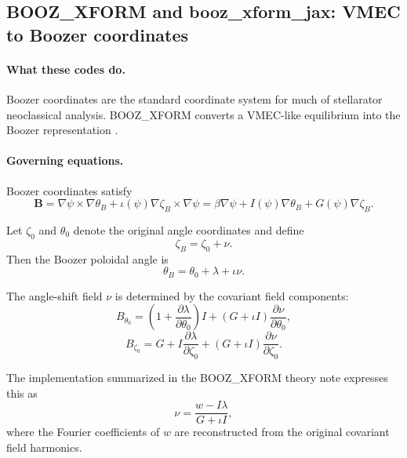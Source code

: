 \documentclass[11pt]{article}
\begin{document}
\subsection{BOOZ\_XFORM and booz\_xform\_jax: VMEC to Boozer coordinates}

\paragraph{What these codes do.}
Boozer coordinates are the standard coordinate system for much of stellarator
neoclassical analysis. BOOZ\_XFORM converts a VMEC-like equilibrium into the
Boozer representation \citep{Boozer1983,BoozXformRepo,BoozXformJaxRepo}.

\paragraph{Governing equations.}
Boozer coordinates satisfy
\begin{equation}
\mathbf{B}
=
\nabla\psi\times\nabla\theta_B
+
\iota(\psi)\nabla\zeta_B\times\nabla\psi
=
\beta\nabla\psi + I(\psi)\nabla\theta_B + G(\psi)\nabla\zeta_B.
\end{equation}

Let $\zeta_0$ and $\theta_0$ denote the original angle coordinates and define
\begin{equation}
\zeta_B = \zeta_0 + \nu.
\end{equation}
Then the Boozer poloidal angle is
\begin{equation}
\theta_B = \theta_0 + \lambda + \iota\nu.
\end{equation}

The angle-shift field $\nu$ is determined by the covariant field components:
\begin{equation}
B_{\theta_0}
=
\left(1+\frac{\partial\lambda}{\partial\theta_0}\right)I
+
(G+\iota I)\frac{\partial\nu}{\partial\theta_0},
\end{equation}
\begin{equation}
B_{\zeta_0}
=
G + I\frac{\partial\lambda}{\partial\zeta_0}
+
(G+\iota I)\frac{\partial\nu}{\partial\zeta_0}.
\end{equation}

The implementation summarized in the BOOZ\_XFORM theory note expresses this as
\begin{equation}
\nu = \frac{w - I\lambda}{G+\iota I},
\end{equation}
where the Fourier coefficients of $w$ are reconstructed from the original
covariant field harmonics.
\end{document}
